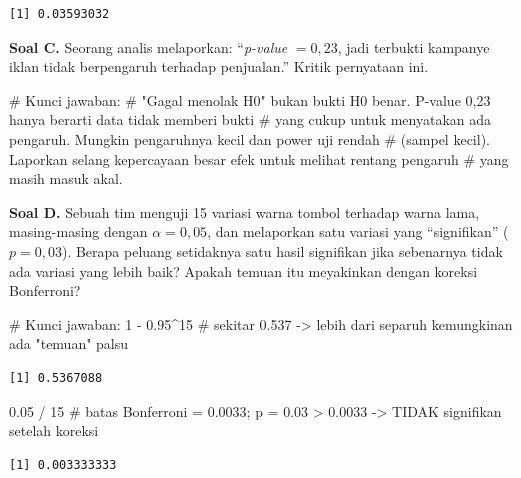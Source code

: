 \documentclass[
  indonesian,
  letterpaper,
]{book}
\newenvironment{Shaded}{\begin{snugshade}}{\end{snugshade}}
\newcommand{\CommentTok}[1]{\textcolor[rgb]{0.37,0.37,0.37}{#1}}
\newcommand{\DecValTok}[1]{\textcolor[rgb]{0.68,0.00,0.00}{#1}}
\newcommand{\FloatTok}[1]{\textcolor[rgb]{0.68,0.00,0.00}{#1}}
\newcommand{\SpecialCharTok}[1]{\textcolor[rgb]{0.37,0.37,0.37}{#1}}
\begin{document}
\begin{verbatim}
[1] 0.03593032
\end{verbatim}

\textbf{Soal C.} Seorang analis melaporkan: ``\emph{p-value}
\(= 0{,}23\), jadi terbukti kampanye iklan tidak berpengaruh terhadap
penjualan.'' Kritik pernyataan ini.

\begin{Shaded}
\begin{Highlighting}[]
\CommentTok{\# Kunci jawaban:}
\CommentTok{\# "Gagal menolak H0" bukan bukti H0 benar. P{-}value 0,23 hanya berarti data tidak memberi bukti}
\CommentTok{\# yang cukup untuk menyatakan ada pengaruh. Mungkin pengaruhnya kecil dan power uji rendah}
\CommentTok{\# (sampel kecil). Laporkan selang kepercayaan besar efek untuk melihat rentang pengaruh}
\CommentTok{\# yang masih masuk akal.}
\end{Highlighting}
\end{Shaded}

\textbf{Soal D.} Sebuah tim menguji 15 variasi warna tombol terhadap
warna lama, masing-masing dengan \(\alpha = 0{,}05\), dan melaporkan
satu variasi yang ``signifikan'' (\(p = 0{,}03\)). Berapa peluang
setidaknya satu hasil signifikan jika sebenarnya tidak ada variasi yang
lebih baik? Apakah temuan itu meyakinkan dengan koreksi Bonferroni?

\begin{Shaded}
\begin{Highlighting}[]
\CommentTok{\# Kunci jawaban:}
\DecValTok{1} \SpecialCharTok{{-}} \FloatTok{0.95}\SpecialCharTok{\^{}}\DecValTok{15}   \CommentTok{\# sekitar 0.537 {-}\textgreater{} lebih dari separuh kemungkinan ada "temuan" palsu}
\end{Highlighting}
\end{Shaded}

\begin{verbatim}
[1] 0.5367088
\end{verbatim}

\begin{Shaded}
\begin{Highlighting}[]
\FloatTok{0.05} \SpecialCharTok{/} \DecValTok{15}     \CommentTok{\# batas Bonferroni = 0.0033; p = 0.03 \textgreater{} 0.0033 {-}\textgreater{} TIDAK signifikan setelah koreksi}
\end{Highlighting}
\end{Shaded}

\begin{verbatim}
[1] 0.003333333
\end{verbatim}
\end{document}
